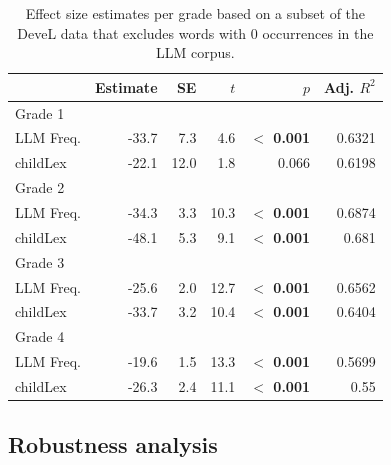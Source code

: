 \documentclass[doc, a4paper, anonymous]{apa7}
\begin{document}
\begin{table}[!htbp]
\caption{Effect size estimates per grade based on a subset of the DeveL data that excludes words with 0 occurrences in the LLM corpus. }
\centering
\begin{tabular}{lrrrrr}
  \hline
 & Estimate & SE & $t$ & $p$ & Adj. $R^2$   \\ 
  \hline
  Grade 1 \\ 
  LLM Freq. & -33.7 & 7.3 & 4.6 & \textbf{$<$ 0.001} & 0.6321 \\ 
  childLex & -22.1 & 12.0 & 1.8 & 0.066 & 0.6198\\ 
  Grade 2 \\ 
  LLM Freq. & -34.3 & 3.3 & 10.3 & \textbf{$<$ 0.001} & 0.6874 \\ 
  childLex & -48.1 & 5.3 & 9.1 & \textbf{$<$ 0.001} & 0.681 \\ 
    Grade 3 \\ 
  LLM Freq. & -25.6 & 2.0 & 12.7 & \textbf{$<$ 0.001} & 0.6562 \\ 
  childLex & -33.7 & 3.2 & 10.4 & \textbf{$<$ 0.001} & 0.6404 \\ 
      Grade 4 \\ 
  LLM Freq. & -19.6 & 1.5 & 13.3 & \textbf{$<$ 0.001} & 0.5699 \\ 
  childLex & -26.3 & 2.4 & 11.1 & \textbf{$<$ 0.001} & 0.55 \\ 
  \hline
\end{tabular}
\end{table}

\clearpage




\subsection{Robustness analysis}\label{sec:rob}
\end{document}

